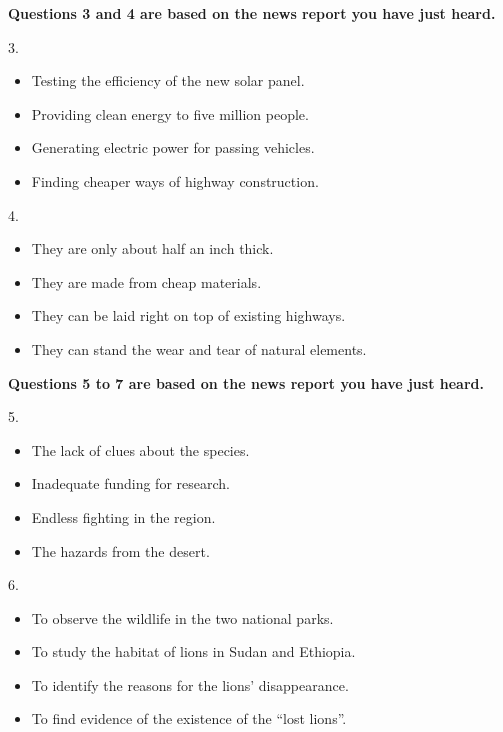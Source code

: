 \documentclass[UTF8,11pt]{ctexart}
\begin{document}
\textbf{Questions 3 and 4 are based on the news report you have just heard.}


3.


\begin{itemize}[leftmargin=2em,itemsep=.2em,topsep=.4em]\item[A.] Testing the efficiency of the new solar panel.
\item[B.] Providing clean energy to five million people.
\item[C.] Generating electric power for passing vehicles.
\item[D.] Finding cheaper ways of highway construction.
\end{itemize}

4.


\begin{itemize}[leftmargin=2em,itemsep=.2em,topsep=.4em]\item[A.] They are only about half an inch thick.
\item[B.] They are made from cheap materials.
\item[C.] They can be laid right on top of existing highways.
\item[D.] They can stand the wear and tear of natural elements.
\end{itemize}

\textbf{Questions 5 to 7 are based on the news report you have just heard.}


5.


\begin{itemize}[leftmargin=2em,itemsep=.2em,topsep=.4em]\item[A.] The lack of clues about the species.
\item[B.] Inadequate funding for research.
\item[C.] Endless fighting in the region.
\item[D.] The hazards from the desert.
\end{itemize}

6.


\begin{itemize}[leftmargin=2em,itemsep=.2em,topsep=.4em]\item[A.] To observe the wildlife in the two national parks.
\item[B.] To study the habitat of lions in Sudan and Ethiopia.
\item[C.] To identify the reasons for the lions’ disappearance.
\item[D.] To find evidence of the existence of the “lost lions”.
\end{itemize}
\end{document}
